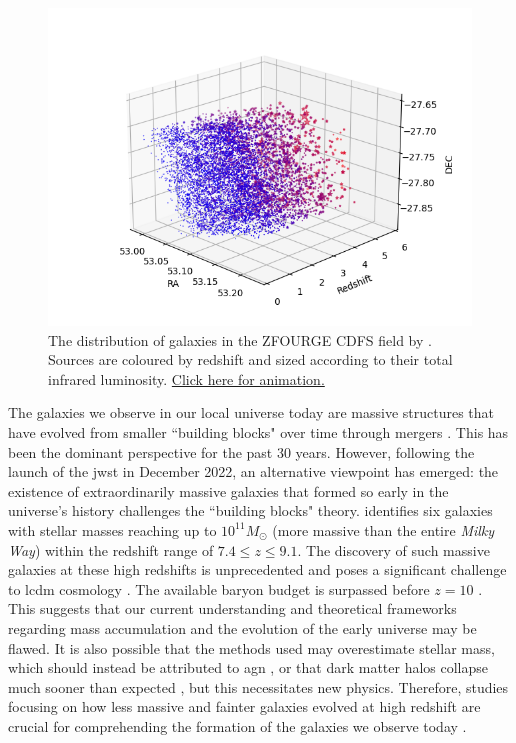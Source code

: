 \begin{figure}[b!]
    \centering
    \includegraphics[width=\linewidth]{Figures/CDFS.png}
    \caption{The distribution of galaxies in the ZFOURGE CDFS field by \cite{lyon_decomposing_2024}. Sources are coloured by redshift and sized according to their total infrared luminosity. \href{https://www.youtube.com/watch?v=kTXSLjLGoNM}{Click here for animation.}}
    \label{Fig: Animation}
\end{figure}

The galaxies we observe in our local universe today are massive structures that have evolved from smaller ``building blocks" over time through mergers \citep{magorrian_demography_1998, ziparo_primordial_2024}. This has been the dominant perspective for the past 30 years. However, following the launch of the \gls{jwst} in December 2022, an alternative viewpoint has emerged: the existence of extraordinarily massive galaxies that formed so early in the universe's history challenges the ``building blocks" theory. \cite{labbe_population_2023} identifies six galaxies with stellar masses reaching up to $10^{11} M_{\odot}$ (more massive than the entire \textit{Milky Way}) within the redshift range of $7.4 \leq z \leq 9.1$. The discovery of such massive galaxies at these high redshifts is unprecedented and poses a significant challenge to \gls{lcdm} cosmology \citep{behroozi_most_2018, labbe_population_2023, greene_uncover_2024, bezanson_jwst_2024}. The available baryon budget is surpassed before $z=10$ \citep{menci_high-redshift_2022, boylan-kolchin_stress_2023}. This suggests that our current understanding and theoretical frameworks regarding mass accumulation and the evolution of the early universe may be flawed. It is also possible that the methods used may overestimate stellar mass, which should instead be attributed to \gls{agn} \citep{labbe_population_2023}, or that dark matter halos collapse much sooner than expected \citep{steinhardt_impossibly_2016}, but this necessitates new physics. Therefore, studies focusing on how less massive and fainter galaxies evolved at high redshift are crucial for comprehending the formation of the galaxies we observe today \citep{adams_discovery_2023, matthee_little_2024}.

